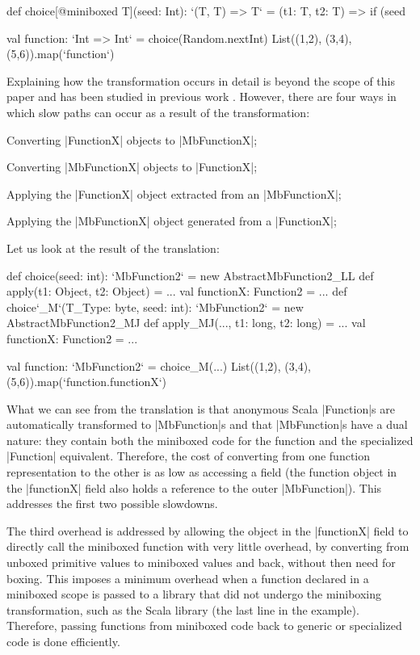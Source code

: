 \begin{lstlisting-nobreak}
 def choice[@miniboxed T](seed: Int): `(T, T) => T` =
   (t1: T, t2: T) => if (seed %

 val function: `Int => Int` = choice(Random.nextInt)
 List((1,2), (3,4), (5,6)).map(`function`)
\end{lstlisting-nobreak}

Explaining how the transformation occurs in detail is beyond the scope of this paper and has been studied in previous work \cite{ldl,ildl-tech}. However, there are four ways in which slow paths can occur as a result of the transformation:
\begin{compactitem}
  \item Converting |FunctionX| objects to |MbFunctionX|;
  \item Converting |MbFunctionX| objects to |FunctionX|;
  \item Applying the |FunctionX| object extracted from an |MbFunctionX|;
  \item Applying the |MbFunctionX| object generated from a |FunctionX|;
\end{compactitem}

Let us look at the result of the translation:

\begin{lstlisting-nobreak}
 def choice(seed: int): `MbFunction2` =
   new AbstractMbFunction2_LL {
     def apply(t1: Object, t2: Object) = ...
     val functionX: Function2 = ...
   }
 def choice`_M`(T_Type: byte, seed: int): `MbFunction2` =
   new AbstractMbFunction2_MJ {
     def apply_MJ(..., t1: long, t2: long) = ...
     val functionX: Function2 = ...
   }

 val function: `MbFunction2` = choice_M(...)
 List((1,2), (3,4), (5,6)).map(`function.functionX`)
\end{lstlisting-nobreak}

What we can see from the translation is that anonymous Scala |Function|s are automatically transformed to |MbFunction|s and that |MbFunction|s have a dual nature: they contain both the miniboxed code for the function and the specialized |Function| equivalent. Therefore, the cost of converting from one function representation to the other is as low as accessing a field (the function object in the |functionX| field also holds a reference to the outer |MbFunction|). This addresses the first two possible slowdowns.

The third overhead is addressed by allowing the object in the |functionX| field to directly call the miniboxed function with very little overhead, by converting from unboxed primitive values to miniboxed values and back, without then need for boxing. This imposes a minimum overhead when a function declared in a miniboxed scope is passed to a library that did not undergo the miniboxing transformation, such as the Scala library (the last line in the example). Therefore, passing functions from miniboxed code back to generic or specialized code is done efficiently.

